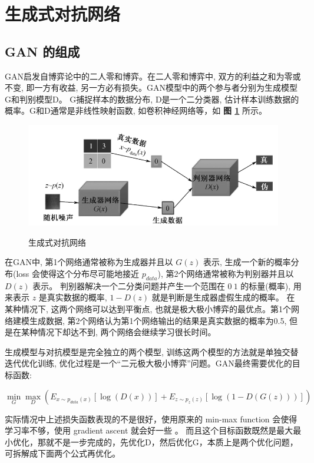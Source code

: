 \section{生成式对抗网络}

\subsection{GAN 的组成}
GAN启发自博弈论中的二人零和博弈。在二人零和博弈中, 双方的利益之和为零或不变, 即一方有收益, 另一方必有损失。GAN模型中的两个参与者分别为生成模型G和判别模型D。
G捕捉样本的数据分布, D是一个二分类器, 估计样本训练数据的概率。G和D通常是非线性映射函数, 如卷积神经网络等，如 \textbf{图 \ref{fig:gan}} 所示。

\begin{figure}[h!]
	\caption{生成式对抗网络}
	\centering
	\includegraphics[width=\textwidth]{figure/resources/gan.png}
	\label{fig:gan}
\end{figure}


在GAN中, 第1个网络通常被称为生成器并且以 $G(z)$ 表示, 生成一个新的概率分布(loss 会使得这个分布尽可能地接近 $p_{data}$), 第2个网络通常被称为判别器并且以 $D(z)$ 表示。
判别器解决一个二分类问题并产生一个范围在 $0~1$ 的标量(概率), 用来表示 $z$ 是真实数据的概率, $1 - D(z)$ 就是判断是生成器虚假生成的概率。
在某种情况下, 这两个网络可以达到平衡点, 也就是极大极小博弈的最优点。第1个网络建模生成数据, 第2个网络认为第1个网络输出的结果是真实数据的概率为0.5, 但是在某种情况下却达不到, 两个网络会继续学习很长时间。


生成模型与对抗模型是完全独立的两个模型, 训练这两个模型的方法就是单独交替迭代优化训练, 优化过程是一个“二元极大极小博弈”问题。GAN最终需要优化的目标函数:

\begin{equation}
\min_G \max_D (E_{x \sim p_{data}(x)} [\log (D(x)) ] + E_{z \sim p_z(z)} [ \log (1 - D(G(z)))])
\end{equation}


实际情况中上述损失函数表现的不是很好，使用原来的 min-max function 会使得学习率不够，使用 gradient ascent 就会好一些 \cite{GAN}。
而且这个目标函数既然是最大最小优化，那就不是一步完成的，先优化D，然后优化G，本质上是两个优化问题，可拆解成下面两个公式再优化。


